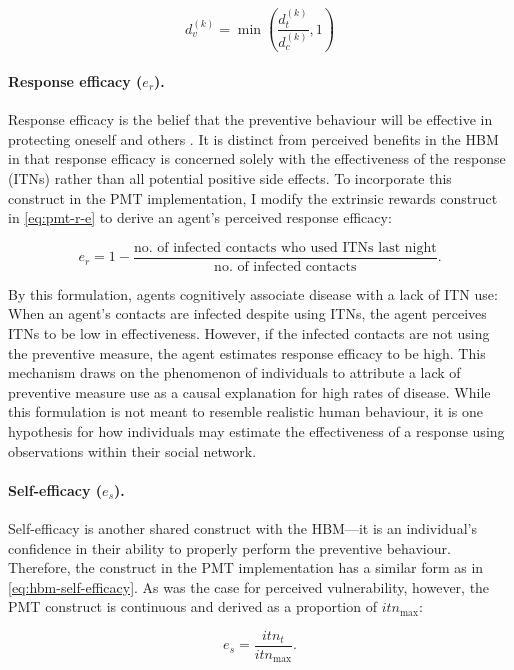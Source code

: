 \begin{equation}
    d_v^{(k)}=\min\left(\frac{d^{(k)}_t}{d^{(k)}_c},1\right)
\end{equation}

\paragraph{Response efficacy ($e_r$).}Response efficacy is the belief that the preventive behaviour will be effective in protecting oneself and others \cite{marikyan_protection_2023}. It is distinct from perceived benefits in the HBM in that response efficacy is concerned solely with the effectiveness of the response (ITNs) rather than all potential positive side effects. To incorporate this construct in the PMT implementation, I modify the extrinsic rewards construct in \eqref{eq:pmt-r-e} to derive an agent's perceived response efficacy:

\begin{equation}\label{eq:response-efficacy}
    e_r=1-\frac{\text{no. of infected contacts who used ITNs last night}}{\text{no. of infected contacts}}.
\end{equation}

By this formulation, agents cognitively associate disease with a lack of ITN use: When an agent's contacts are infected despite using ITNs, the agent perceives ITNs to be low in effectiveness. However, if the infected contacts are not using the preventive measure, the agent estimates response efficacy to be high. This mechanism draws on the phenomenon of individuals to attribute a lack of preventive measure use as a causal explanation for high rates of disease. While this formulation is not meant to resemble realistic human behaviour, it is one hypothesis for how individuals may estimate the effectiveness of a response using observations within their social network.

\paragraph{Self-efficacy ($e_s$).}Self-efficacy is another shared construct with the HBM---it is an individual's confidence in their ability to properly perform the preventive behaviour. Therefore, the construct in the PMT implementation has a similar form as in \eqref{eq:hbm-self-efficacy}. As was the case for perceived vulnerability, however, the PMT construct is continuous and derived as a proportion of $itn_{\max}$:

\begin{equation}
    e_s=\frac{itn_t}{itn_{\max}}.
\end{equation}

